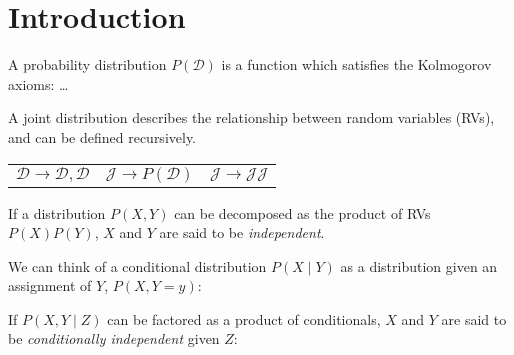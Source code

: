 \documentclass{article}
\begin{document}
\section{Introduction}\label{sec:intro}

A probability distribution $P(\mathcal D)$ is a function which satisfies the Kolmogorov axioms: \ldots


A joint distribution describes the relationship between random variables (RVs), and can be defined recursively.

\begin{center}
\begin{tabular}{ccc}
    $\mathcal{D} \rightarrow \mathcal{D}, \mathcal{D}$ &$\mathcal{J} \rightarrow P(\mathcal{D})$ &$\mathcal{J} \rightarrow \mathcal{J}\mathcal{J}$\\
\end{tabular}
\end{center}

If a distribution $P(X, Y)$ can be decomposed as the product of RVs $P(X)P(Y)$, $X$ and $Y$ are said to be \textit{independent}.

\begin{prooftree}
\end{prooftree}

We can think of a conditional distribution $P(X \mid Y)$ as a distribution given an assignment of $Y$, $P(X, Y = y)$:

\begin{prooftree}
\end{prooftree}

\begin{prooftree}
\end{prooftree}

If $P(X, Y \mid Z)$ can be factored as a product of conditionals, $X$ and $Y$ are said to be \textit{conditionally independent} given $Z$:
\end{document}
